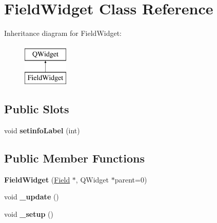 \hypertarget{class_field_widget}{}\section{Field\+Widget Class Reference}
\label{class_field_widget}
Inheritance diagram for Field\+Widget\+:\begin{figure}[H]
\begin{center}
\leavevmode
\includegraphics[height=2.000000cm]{class_field_widget}
\end{center}
\end{figure}
\subsection*{Public Slots}
\begin{DoxyCompactItemize}
\item 
\mbox{\label{class_field_widget_a5d8530461c8f98b9e6a4c97b1d0de5b6}} 
void {\bfseries setinfo\+Label} (int)
\end{DoxyCompactItemize}
\subsection*{Public Member Functions}
\begin{DoxyCompactItemize}
\item 
\mbox{\label{class_field_widget_ad74cf86f2e666c58601f834d9a64ee7d}} 
{\bfseries Field\+Widget} (\hyperlink{class_field}{Field} $\ast$, Q\+Widget $\ast$parent=0)
\item 
\mbox{\label{class_field_widget_aaf6af77b4c25a6a3cd8a8642ed9a86c1}} 
void {\bfseries \+\_\+update} ()
\item 
\mbox{\label{class_field_widget_a5ee103449641c0a6430706699d016bdf}} 
void {\bfseries \+\_\+setup} ()
\end{DoxyCompactItemize}
